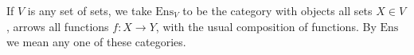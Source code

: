 If $V$ is any set of sets, we take $\text{Ens}_V$ to be the category with objects all sets $X \in V$, arrows all functions $f : X \to Y$, with the usual composition of functions. By $\text{Ens}$ we mean any one of these categories.
